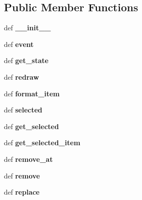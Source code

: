 \subsection*{Public Member Functions}
\begin{DoxyCompactItemize}
\item 
\hypertarget{classselectdialog_1_1TextList_a64c584b530d7829d9eba5287d807cd13}{def {\bfseries \-\_\-\-\_\-init\-\_\-\-\_\-}}\label{classselectdialog_1_1TextList_a64c584b530d7829d9eba5287d807cd13}

\item 
\hypertarget{classselectdialog_1_1TextList_ac1f4e713d0473dbba99ba82674947161}{def {\bfseries event}}\label{classselectdialog_1_1TextList_ac1f4e713d0473dbba99ba82674947161}

\item 
\hypertarget{classselectdialog_1_1TextList_a74de44978d0ae55c6d7ec62c4ce4b027}{def {\bfseries get\-\_\-state}}\label{classselectdialog_1_1TextList_a74de44978d0ae55c6d7ec62c4ce4b027}

\item 
\hypertarget{classselectdialog_1_1TextList_a950b9c0303d2c564926a8b6c30e58aa9}{def {\bfseries redraw}}\label{classselectdialog_1_1TextList_a950b9c0303d2c564926a8b6c30e58aa9}

\item 
\hypertarget{classselectdialog_1_1TextList_a5e99de791bb502fbb15f867ad520b60b}{def {\bfseries format\-\_\-item}}\label{classselectdialog_1_1TextList_a5e99de791bb502fbb15f867ad520b60b}

\item 
\hypertarget{classselectdialog_1_1TextList_ac69606b47a872b4dcda0f8d34bde9225}{def {\bfseries selected}}\label{classselectdialog_1_1TextList_ac69606b47a872b4dcda0f8d34bde9225}

\item 
\hypertarget{classselectdialog_1_1TextList_ab31b27c42622b998fed479848f777cb3}{def {\bfseries get\-\_\-selected}}\label{classselectdialog_1_1TextList_ab31b27c42622b998fed479848f777cb3}

\item 
\hypertarget{classselectdialog_1_1TextList_a3b69f3a018755c286f44b4cf66ae01d4}{def {\bfseries get\-\_\-selected\-\_\-item}}\label{classselectdialog_1_1TextList_a3b69f3a018755c286f44b4cf66ae01d4}

\item 
\hypertarget{classselectdialog_1_1TextList_a0a3d33200f5507492d6da3697f352969}{def {\bfseries remove\-\_\-at}}\label{classselectdialog_1_1TextList_a0a3d33200f5507492d6da3697f352969}

\item 
\hypertarget{classselectdialog_1_1TextList_ab9bff5a624c27421582edc7e747374e6}{def {\bfseries remove}}\label{classselectdialog_1_1TextList_ab9bff5a624c27421582edc7e747374e6}

\item 
\hypertarget{classselectdialog_1_1TextList_ad08394e14f3ec0228e0cda00320266a2}{def {\bfseries replace}}\label{classselectdialog_1_1TextList_ad08394e14f3ec0228e0cda00320266a2}

\end{DoxyCompactItemize}
